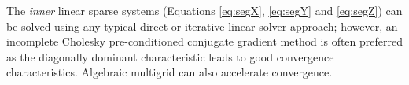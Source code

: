 \documentclass[sn-mathphys,Numbered]{sn-jnl}%
\begin{document}
The \emph{inner} linear sparse systems (Equations \ref{eq:segX}, \ref{eq:segY} and \ref{eq:segZ}) can be solved using any typical direct or iterative linear solver approach; however, an incomplete Cholesky pre-conditioned conjugate gradient method \cite{Jacobs1986} is often preferred as the diagonally dominant characteristic leads to good convergence characteristics.
Algebraic multigrid can also accelerate convergence.
%
\end{document}
